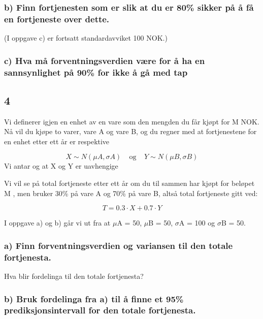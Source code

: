 \documentclass[
  12pt,
  a4paper,
  DIV=11,
  numbers=noendperiod]{scrartcl}
\begin{document}
\subsubsection{b) Finn fortjenesten som er slik at du er 80\% sikker på
å få en fortjeneste over
dette.}\label{b-finn-fortjenesten-som-er-slik-at-du-er-80-sikker-puxe5-uxe5-fuxe5-en-fortjeneste-over-dette.}

(I oppgave c) er fortsatt standardavviket 100 NOK.)

\subsubsection{c) Hva må forventningsverdien være for å ha en
sannsynlighet på 90\% for ikke å gå med
tap}\label{c-hva-muxe5-forventningsverdien-vuxe6re-for-uxe5-ha-en-sannsynlighet-puxe5-90-for-ikke-uxe5-guxe5-med-tap}

\subsection{4}\label{section-3}

Vi definerer igjen en enhet av en vare som den mengden du får kjøpt for
M NOK. Nå vil du kjøpe to varer, vare A og vare B, og du regner med at
fortjenestene for en enhet etter ett år er respektive

\[ 
X ∼ N(\mu A, \sigma A) \> \> \> \> \> \text{og} \> \> \> \> \> Y ∼ N(\mu B , \sigma B )
\] Vi antar og at X og Y er uavhengige

Vi vil se på total fortjeneste etter ett år om du til sammen har kjøpt
for beløpet M , men bruker 30\% på vare A og 70\% på vare B, altså total
fortjeneste gitt ved:

\[
T = 0.3 · X + 0.7 · Y
\]

I oppgave a) og b) går vi ut fra at \(\mu\)A = 50, \(\mu\)B = 50,
\(\sigma\)A = 100 og \(\sigma\)B = 50.

\subsubsection{a) Finn forventningsverdien og variansen til den totale
fortjenesta.}\label{a-finn-forventningsverdien-og-variansen-til-den-totale-fortjenesta.}

Hva blir fordelinga til den totale fortjenesta?

\subsubsection{b) Bruk fordelinga fra a) til å finne et 95\%
prediksjonsintervall for den totale
fortjenesta.}\label{b-bruk-fordelinga-fra-a-til-uxe5-finne-et-95-prediksjonsintervall-for-den-totale-fortjenesta.}
\end{document}
